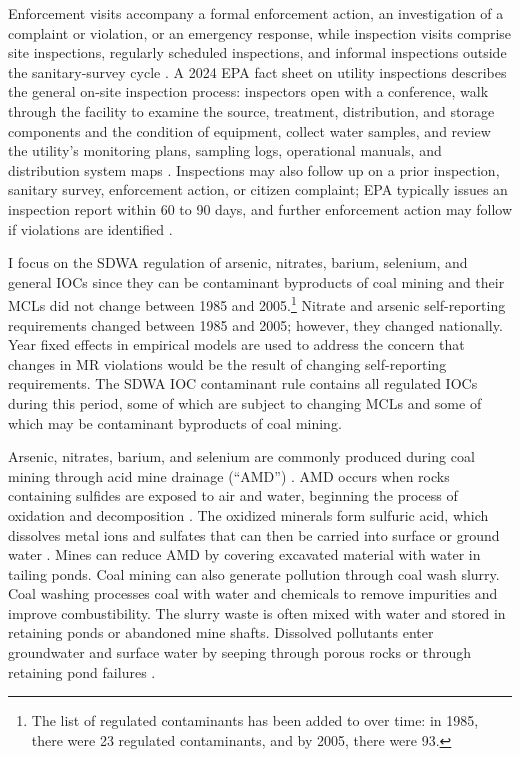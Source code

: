 \documentclass[12pt]{article}
\begin{document}
Enforcement visits accompany a formal enforcement action, an investigation of a complaint or violation, or an emergency response, while inspection visits comprise site inspections, regularly scheduled inspections, and informal inspections outside the sanitary-survey cycle \parencite{epaSDWAEchoDownload}. A 2024 EPA fact sheet on utility inspections describes the general on-site inspection process: inspectors open with a conference, walk through the facility to examine the source, treatment, distribution, and storage components and the condition of equipment, collect water samples, and review the utility's monitoring plans, sampling logs, operational manuals, and distribution system maps \parencite{epaInspectionFactsheet2024}. Inspections may also follow up on a prior inspection, sanitary survey, enforcement action, or citizen complaint; EPA typically issues an inspection report within 60 to 90 days, and further enforcement action may follow if violations are identified \parencite{epaInspectionFactsheet2024}.

I focus on the SDWA regulation of arsenic, nitrates, barium, selenium, and general IOCs since they can be contaminant byproducts of coal mining and their MCLs did not change between 1985 and 2005.\footnote{The list of regulated contaminants has been added to over time: in 1985, there were 23 regulated contaminants, and by 2005, there were 93.} Nitrate and arsenic self-reporting requirements changed between 1985 and 2005; however, they changed nationally. Year fixed effects in empirical models are used to address the concern that changes in MR violations would be the result of changing self-reporting requirements. The SDWA IOC contaminant rule contains all regulated IOCs during this period, some of which are subject to changing MCLs and some of which may be contaminant byproducts of coal mining. 

Arsenic, nitrates, barium, and selenium are commonly produced during coal mining through acid mine drainage (``AMD'') \parencite{liang2017spatial, boente2020benzo, rouhani2023overview}. AMD occurs when rocks containing sulfides are exposed to air and water, beginning the process of oxidation and decomposition \parencite{ceto2000abandoned}. The oxidized minerals form sulfuric acid, which dissolves metal ions and sulfates that can then be carried into surface or ground water \parencite{akcil2006acid, skousen2019acid}. Mines can reduce AMD by covering excavated material with water in tailing ponds. Coal mining can also generate pollution through coal wash slurry. Coal washing processes coal with water and chemicals to remove impurities and improve combustibility. The slurry waste is often mixed with water and stored in retaining ponds or abandoned mine shafts. Dissolved pollutants enter groundwater and surface water by seeping through porous rocks or through retaining pond failures \parencite{Sealey2000}.
\end{document}
